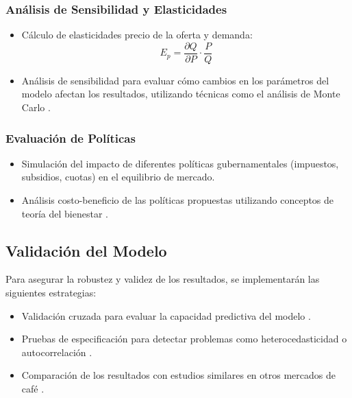 \documentclass[12pt, a4paper]{article}
\begin{document}
\subsubsection{Análisis de Sensibilidad y Elasticidades}
\begin{itemize}
    \item Cálculo de elasticidades precio de la oferta y demanda:
    \begin{equation}
        E_p = \frac{\partial Q}{\partial P} \cdot \frac{P}{Q}
    \end{equation}
    
    \item Análisis de sensibilidad para evaluar cómo cambios en los parámetros del modelo afectan los resultados, utilizando técnicas como el análisis de Monte Carlo \parencite{metropolis1949}.
\end{itemize}

\subsubsection{Evaluación de Políticas}
\begin{itemize}
    \item Simulación del impacto de diferentes políticas gubernamentales (impuestos, subsidios, cuotas) en el equilibrio de mercado.
    \item Análisis costo-beneficio de las políticas propuestas utilizando conceptos de teoría del bienestar \parencite{just2004}.
\end{itemize}

\subsection{Validación del Modelo}

Para asegurar la robustez y validez de los resultados, se implementarán las siguientes estrategias:

\begin{itemize}
    \item Validación cruzada para evaluar la capacidad predictiva del modelo \parencite{stone1974}.
    \item Pruebas de especificación para detectar problemas como heterocedasticidad o autocorrelación \parencite{white1980}.
    \item Comparación de los resultados con estudios similares en otros mercados de café \parencite{rueda2018}.
\end{itemize}
\end{document}
